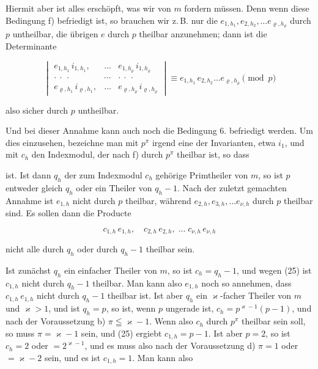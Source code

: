 
Hiermit aber ist alles ersch\"opft, was wir von $m$ fordern m\"ussen. Denn
wenn diese Bedingung f) befriedigt ist, so brauchen wir z.\,B. nur die
$e_{1,h_1}, e_{2,h_2}, \dots e_{\varrho,h_\varrho}$ durch $p$ untheilbar,
die \"ubrigen $e$ durch $p$ theilbar anzunehmen; dann ist die Determinante

\[
\begin{vmatrix}
e_{1,h_1}\,i_{1,h_1}, & \dots & e_{1,h_\varrho}\,i_{1,h_\varrho} \\
\cdot\ \cdot\ \cdot & \cdots & \cdot\ \cdot\ \cdot \\
e_{\varrho,h_1}\,i_{\varrho,h_1}, & \dots & e_{\varrho,h_\varrho}\,i_{\varrho,h_\varrho}
\end{vmatrix}
\equiv e_{1,h_1}\,e_{2,h_2} \dots e_{\varrho,h_\varrho} \pmod{p}
\]

also sicher durch $p$ untheilbar.

Und bei dieser Annahme kann auch noch die Bedingung 6. befriedigt werden.
Um dies einzusehen, bezeichne man mit $p^\pi$ irgend eine der Invarianten,
etwa $i_1$, und mit $c_h$ den Indexmodul, der nach f) durch $p^\pi$
theilbar ist, so dass


ist. Ist dann $q_h$ der zum Indexmodul $c_h$ geh\"orige Primtheiler von
$m$, so ist $p$ entweder gleich $q_h$ oder ein Theiler von $q_h - 1$. Nach
der zuletzt gemachten Annahme ist $e_{1,h}$ nicht durch $p$ theilbar,
w\"ahrend $e_{2,h}, e_{3,h}, \dots e_{\nu,h}$ durch $p$ theilbar sind. Es
sollen dann die Producte

\[
c_{1,h}\,e_{1,h}, \quad c_{2,h}\,e_{2,h}, \; \dots \; c_{\nu,h}\,e_{\nu,h}
\]

nicht alle durch $q_h$ oder durch $q_h - 1$ theilbar sein.

Ist zun\"achst $q_h$ ein einfacher Theiler von $m$, so ist $c_h = q_h -
1$, und wegen (25) ist $c_{1,h}$ nicht durch $q_h - 1$ theilbar. Man kann
also $e_{1,h}$ noch so annehmen, dass $c_{1,h}\,e_{1,h}$ nicht durch
$q_h - 1$ theilbar ist. Ist aber $q_h$ ein $\varkappa$-facher Theiler von
$m$ und $\varkappa > 1$, und ist $q_h = p$, so ist, wenn $p$ ungerade
ist, $c_h = p^{\varkappa - 1}(p-1)$, und nach der Voraussetzung b)
$\pi \leqq \varkappa - 1$. Wenn also $c_h$ durch $p^\pi$ theilbar sein
soll, so muss $\pi = \varkappa - 1$ sein, und (25) ergiebt $c_{1,h} =
p - 1$. Ist aber $p = 2$, so ist $c_h = 2$ oder $= 2^{\varkappa - 1}$,
und es muss also nach der Voraussetzung d) $\pi = 1$ oder $= \varkappa -
2$ sein, und es ist $c_{1,h} = 1$. Man kann also

